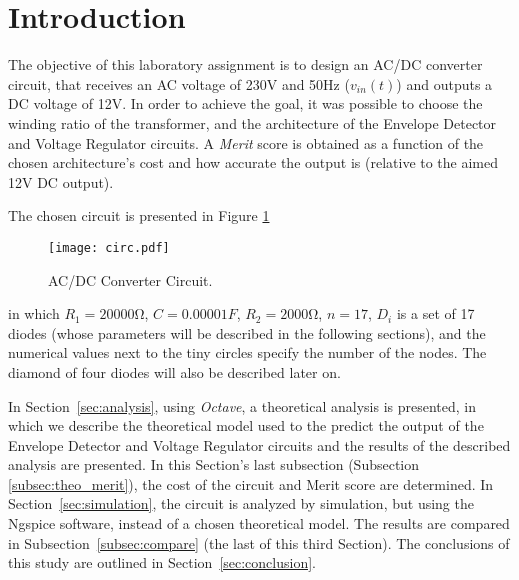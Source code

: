 \section{Introduction}
\label{sec:introduction}

The objective of this laboratory assignment is to design an AC/DC converter circuit, that receives an AC voltage of 230V and 50Hz ($v_{in}(t)$) and outputs a DC voltage of 12V. In order to achieve the goal, it was possible to choose the winding ratio of the transformer, and the architecture of the Envelope Detector and Voltage Regulator circuits. A \textit{Merit} score is obtained as a function of the chosen architecture's cost and how accurate the output is (relative to the aimed 12V DC output). 

The chosen circuit is presented in Figure \ref{fig:circ}


\begin{figure}[h] \centering
\texttt{[image: circ.pdf]}
\caption{AC/DC Converter Circuit.}
\label{fig:circ}
\end{figure}

in which $R_1 = 20000 \si{\ohm}$, $C=0.00001 F$, $R_2 = 2000 \si{\ohm}$, $n=17$, $D_i$ is a set of 17 diodes (whose parameters will be described in the following sections), and the numerical values next to the tiny circles specify the number of the nodes. The diamond of four diodes will also be described later on.


In Section~\ref{sec:analysis}, using \textit{Octave}, a theoretical analysis is presented, in which we describe the theoretical model used to the predict the output of the Envelope Detector and Voltage Regulator circuits and the results of the described analysis are presented. In this Section's last subsection (Subsection \ref{subsec:theo_merit}), the cost of the circuit and Merit score are determined. In Section~\ref{sec:simulation}, the circuit is analyzed by simulation, but using the Ngspice software, instead of a chosen theoretical model. The results are compared in Subsection~\ref{subsec:compare} (the last of this third Section). The conclusions of this study are outlined in Section~\ref{sec:conclusion}.